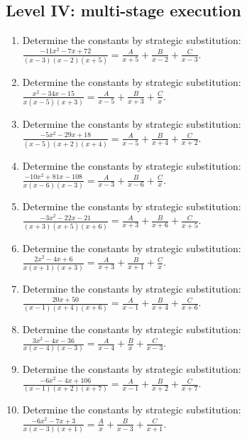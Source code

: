 \documentclass[11pt,oneside]{book}
\begin{document}
\subsection*{Level IV: multi-stage execution}
\begin{enumerate}[leftmargin=*,label=\textbf{\arabic*.},itemsep=0.65\baselineskip]
\item Determine the constants by strategic substitution: $\displaystyle \frac{- 11 x^{2} - 7 x + 72}{\left(x - 3\right) \left(x - 2\right) \left(x + 5\right)}=\frac{A}{x + 5} + \frac{B}{x - 2} + \frac{C}{x - 3}$.
\item Determine the constants by strategic substitution: $\displaystyle \frac{x^{2} - 34 x - 15}{x \left(x - 5\right) \left(x + 3\right)}=\frac{A}{x - 5} + \frac{B}{x + 3} + \frac{C}{x}$.
\item Determine the constants by strategic substitution: $\displaystyle \frac{- 5 x^{2} - 29 x + 18}{\left(x - 5\right) \left(x + 2\right) \left(x + 4\right)}=\frac{A}{x - 5} + \frac{B}{x + 4} + \frac{C}{x + 2}$.
\item Determine the constants by strategic substitution: $\displaystyle \frac{- 10 x^{2} + 81 x - 108}{x \left(x - 6\right) \left(x - 3\right)}=\frac{A}{x - 3} + \frac{B}{x - 6} + \frac{C}{x}$.
\item Determine the constants by strategic substitution: $\displaystyle \frac{- 3 x^{2} - 22 x - 21}{\left(x + 3\right) \left(x + 5\right) \left(x + 6\right)}=\frac{A}{x + 3} + \frac{B}{x + 6} + \frac{C}{x + 5}$.
\item Determine the constants by strategic substitution: $\displaystyle \frac{2 x^{2} - 4 x + 6}{x \left(x + 1\right) \left(x + 3\right)}=\frac{A}{x + 3} + \frac{B}{x + 1} + \frac{C}{x}$.
\item Determine the constants by strategic substitution: $\displaystyle \frac{20 x + 50}{\left(x - 1\right) \left(x + 4\right) \left(x + 6\right)}=\frac{A}{x - 1} + \frac{B}{x + 4} + \frac{C}{x + 6}$.
\item Determine the constants by strategic substitution: $\displaystyle \frac{3 x^{2} - 4 x - 36}{x \left(x - 4\right) \left(x - 3\right)}=\frac{A}{x - 4} + \frac{B}{x} + \frac{C}{x - 3}$.
\item Determine the constants by strategic substitution: $\displaystyle \frac{- 6 x^{2} - 4 x + 106}{\left(x - 1\right) \left(x + 2\right) \left(x + 7\right)}=\frac{A}{x - 1} + \frac{B}{x + 2} + \frac{C}{x + 7}$.
\item Determine the constants by strategic substitution: $\displaystyle \frac{- 6 x^{2} - 7 x + 3}{x \left(x - 3\right) \left(x + 1\right)}=\frac{A}{x} + \frac{B}{x - 3} + \frac{C}{x + 1}$.
\end{enumerate}
\end{document}
